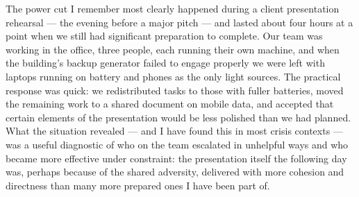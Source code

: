 \begin{ieltsanswer}
The power cut I remember most clearly happened during a client presentation rehearsal — the evening before a major pitch — and lasted about four hours at a point when we still had significant preparation to complete. Our team was working in the office, three people, each running their own machine, and when the building's backup generator failed to engage properly we were left with laptops running on battery and phones as the only light sources. The practical response was quick: we redistributed tasks to those with fuller batteries, moved the remaining work to a shared document on mobile data, and accepted that certain elements of the presentation would be less polished than we had planned. What the situation revealed — and I have found this in most crisis contexts — was a useful diagnostic of who on the team escalated in unhelpful ways and who became more effective under constraint: the presentation itself the following day was, perhaps because of the shared adversity, delivered with more cohesion and directness than many more prepared ones I have been part of.
\end{ieltsanswer}



